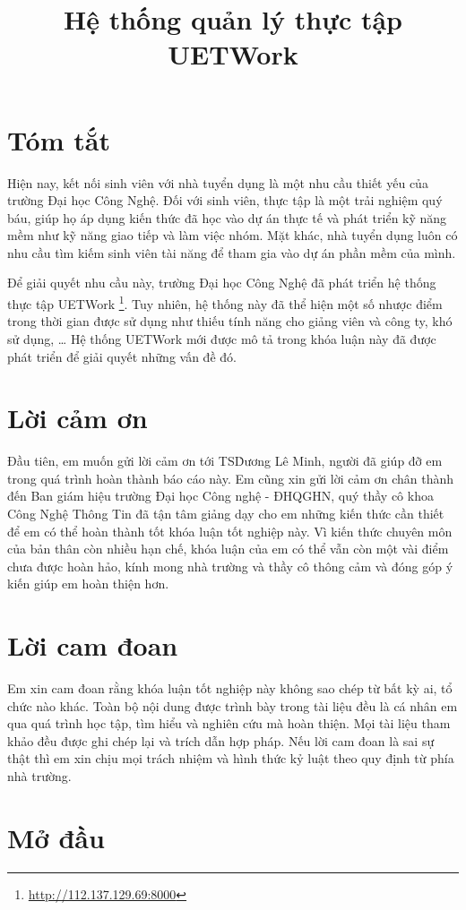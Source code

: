 \documentclass[12pt,a4paper]{report}
\title{Hệ thống quản lý thực tập UETWork}
\begin{document}

\clearpage{}

\chapter*{Tóm tắt}

Hiện nay, kết nối sinh viên với nhà tuyển dụng là một nhu cầu thiết yếu của trường Đại học Công Nghệ. Đối với sinh viên, thực tập là một trải nghiệm quý báu, giúp họ áp dụng kiến thức đã học vào dự án thực tế và phát triển kỹ năng mềm như kỹ năng giao tiếp và làm việc nhóm. Mặt khác, nhà tuyển dụng luôn có nhu cầu tìm kiếm sinh viên tài năng để tham gia vào dự án phần mềm của mình.

Để giải quyết nhu cầu này, trường Đại học Công Nghệ đã phát triển hệ thống thực tập UETWork \footnote{\url{http://112.137.129.69:8000}}. Tuy nhiên, hệ thống này đã thể hiện một số nhược điểm trong thời gian được sử dụng như thiếu tính năng cho giảng viên và công ty, khó sử dụng, \ldots{} Hệ thống UETWork mới được mô tả trong khóa luận này đã được phát triển để giải quyết những vấn đề đó.

\chapter*{Lời cảm ơn}

Đầu tiên, em muốn gửi lời cảm ơn tới TS\. Dương Lê Minh, người đã giúp đỡ em trong quá trình hoàn thành báo cáo này.
Em cũng xin gửi lời cảm ơn chân thành đến Ban giám hiệu trường Đại học Công nghệ - ĐHQGHN, quý thầy cô khoa Công Nghệ Thông Tin đã tận tâm giảng dạy cho em những kiến thức cần thiết để em có thể hoàn thành tốt khóa luận tốt nghiệp này.
Vì kiến thức chuyên môn của bản thân còn nhiều hạn chế, khóa luận của em có thể vẫn còn một vài điểm chưa được hoàn hảo, kính mong nhà trường và thầy cô thông cảm và đóng góp ý kiến giúp em hoàn thiện hơn.

\chapter*{Lời cam đoan}

Em xin cam đoan rằng khóa luận tốt nghiệp này không sao chép từ bất kỳ ai, tổ chức nào khác. Toàn bộ nội dung được trình bày trong tài liệu đều là cá nhân em qua quá trình học tập, tìm hiểu và nghiên cứu mà hoàn thiện. Mọi tài liệu tham khảo đều được ghi chép lại và trích dẫn hợp pháp. Nếu lời cam đoan là sai sự thật thì em xin chịu mọi trách nhiệm và hình thức kỷ luật theo quy định từ phía nhà trường.

\tableofcontents{}
\clearpage{}

\listoffigures{}

\listoftables{}

\chapter{Mở đầu}

\nocite{*}
\printbibliography[heading=bibintoc, title=Tài liệu tham khảo]

\end{document}
